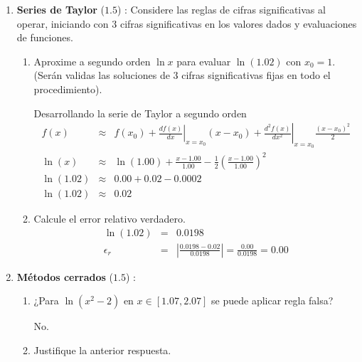 \documentclass[12pt]{article}
\begin{document}
  \begin{enumerate}[leftmargin=*,widest=9]
    \item \textbf{Series de Taylor} ($1.5$) : Considere las reglas de cifras significativas al operar, iniciando con 3 cifras significativas en los valores dados y evaluaciones de funciones.
    
    \begin{enumerate}[label=\alph*]
    \item Aproxime a segundo orden $\ln x$ para evaluar $\ln (1.02)$ con $x_0 = 1$. (Serán validas las soluciones de 3 cifras significativas fijas en todo el procedimiento).
    
    Desarrollando la serie de Taylor a segundo orden
    \begin{eqnarray*}
    f(x) & \approx & f(x_0) + \left.\frac{df(x)}{dx}\right|_{x=x_0}(x-x_0)+ \left.\frac{d^2f(x)}{dx^2}\right|_{x=x_0}\frac{(x-x_0)^2}{2}\\
    \ln(x) & \approx & \ln(1.00) + \frac{x-1.00}{1.00} - \frac{1}{2}\left(\frac{x-1.00}{1.00}\right)^2 \\
    \ln(1.02) & \approx & 0.00 + 0.02 - 0.0002\\
    \ln(1.02) & \approx & 0.02
    \end{eqnarray*}
    
    \item Calcule el error relativo verdadero.
    \begin{eqnarray*}
    \ln(1.02) & = & 0.0198\\
    \epsilon_r & = & \left| \frac{0.0198 - 0.02}{0.0198} \right| = \frac{0.00}{0.0198} = 0.00  
    \end{eqnarray*}
    
    \end{enumerate}

    \item \textbf{Métodos cerrados} ($1.5$) :
    
    \begin{enumerate}[label=\alph*]
    \item ¿Para $\ln (x^2-2)$ en $x \in \left[ 1.07, 2.07 \right]$ se puede aplicar regla falsa?
    
    No.
    
    
    
    \item Justifique la anterior respuesta.
    

\end{enumerate}
\end{enumerate}
\end{document}
